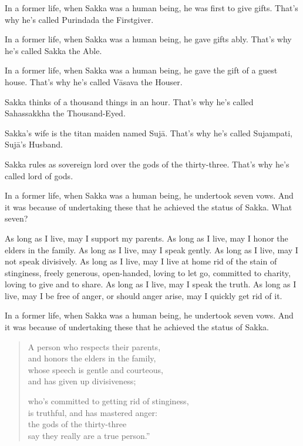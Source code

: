 \documentclass[12pt,openany]{book}%
\begin{document}
In a former life, when Sakka was a human being, he was first to give gifts. That’s why he’s called Purindada the Firstgiver. 

In a former life, when Sakka was a human being, he gave gifts ably. That’s why he’s called Sakka the Able. 

In a former life, when Sakka was a human being, he gave the gift of a guest house. That’s why he’s called \textsanskrit{Vāsava} the Houser. 

Sakka thinks of a thousand things in an hour. That’s why he’s called Sahassakkha the Thousand-Eyed. 

Sakka’s wife is the titan maiden named \textsanskrit{Sujā}. That’s why he’s called Sujampati, \textsanskrit{Sujā}’s Husband. 

Sakka rules as sovereign lord over the gods of the thirty-three. That’s why he’s called lord of gods. 

In a former life, when Sakka was a human being, he undertook seven vows. And it was because of undertaking these that he achieved the status of Sakka. What seven? 

As long as I live, may I support my parents. As long as I live, may I honor the elders in the family. As long as I live, may I speak gently. As long as I live, may I not speak divisively. As long as I live, may I live at home rid of the stain of stinginess, freely generous, open-handed, loving to let go, committed to charity, loving to give and to share. As long as I live, may I speak the truth. As long as I live, may I be free of anger, or should anger arise, may I quickly get rid of it. 

In a former life, when Sakka was a human being, he undertook seven vows. And it was because of undertaking these that he achieved the status of Sakka. 

\begin{verse}%
A person who respects their parents, \\
and honors the elders in the family, \\
whose speech is gentle and courteous, \\
and has given up divisiveness; 

who’s committed to getting rid of stinginess, \\
is truthful, and has mastered anger: \\
the gods of the thirty-three \\
say they really are a true person.” 

%
\end{verse}
\end{document}
